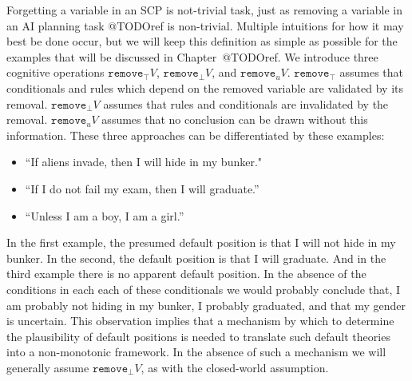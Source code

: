 Forgetting a variable in an SCP is not-trivial task, just as removing a variable in an AI planning task @TODOref is non-trivial. Multiple intuitions for how it may best be done occur, but we will keep this definition as simple as possible for the examples that will be discussed in Chapter~@TODOref. We introduce three cognitive operations $\texttt{remove}_\top V$, $\texttt{remove}_\bot V$, and $\texttt{remove}_u V$. $\texttt{remove}_\top$ assumes that conditionals and rules which depend on the removed variable are validated by its removal. $\texttt{remove}_\bot V$ assumes that rules and conditionals are invalidated by the removal. $\texttt{remove}_u V$ assumes that no conclusion can be drawn without this information.  These three approaches can be differentiated by these examples:

\begin{itemize}
\item ``If aliens invade, then I will hide in my bunker."
\item ``If I do not fail my exam, then I will graduate.''
\item ``Unless I am a boy, I am a girl.''
\end{itemize}

In the first example, the presumed default position is that I will not hide in my bunker. In the second, the default position is that I will graduate. And in the third example there is no apparent default position. In the absence of the conditions in each each of these conditionals we would probably conclude that, I am probably not hiding in my bunker, I probably graduated, and that my gender is uncertain. This observation implies that a mechanism by which to determine the plausibility of default positions is needed to translate such default theories into a non-monotonic framework. In the absence of such a mechanism we will generally assume $\texttt{remove}_\bot V$, as with the closed-world assumption.

